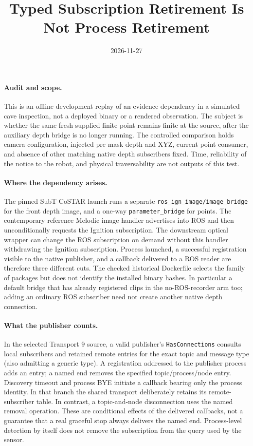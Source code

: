 \documentclass[11pt]{article}
\title{Typed Subscription Retirement Is Not Process Retirement}
\date{2026-11-27}
\begin{document}
\maketitle

\paragraph{Audit and scope.}
This is an offline development replay of an evidence dependency in
a simulated cave inspection, not a deployed binary or a rendered
observation. The subject is whether the same fresh supplied finite
point remains finite at the source, after the auxiliary depth bridge
is no longer running. The controlled comparison holds camera
configuration, injected pre-mask depth and XYZ, current point
consumer, and absence of other matching native depth subscribers fixed.
Time, reliability of the notice to the robot, and physical traversability
are not outputs of this test.

\paragraph{Where the dependency arises.}
The pinned SubT CoSTAR launch runs a separate
\texttt{ros\_ign\_image/image\_bridge} for the front depth image, and a
one-way \texttt{parameter\_bridge} for points. The contemporary reference
Melodic image handler advertises into ROS and then unconditionally
requests the Ignition subscription. The downstream optical wrapper
can change the ROS subscription on demand without this handler
withdrawing the Ignition subscription. Process launched, a successful
registration visible to the native publisher, and a callback delivered
to a ROS reader are therefore three different cuts. The checked historical
Dockerfile selects the family of packages but does not identify the
installed binary hashes. In particular a default bridge that has already
registered clips in the no-ROS-recorder arm too; adding an ordinary
ROS subscriber need not create another native depth connection.

\paragraph{What the publisher counts.}
In the selected Transport 9 source, a valid publisher's
\texttt{HasConnections} consults local subscribers and retained remote
entries for the exact topic and message type (also admitting a generic
type). A registration addressed to the publisher process adds an entry;
a named end removes the specified topic/process/node entry. Discovery
timeout and process BYE initiate a callback bearing only the process
identity. In that branch the shared transport deliberately retains its
remote-subscriber table. In contrast, a topic-and-node disconnection
uses the named removal operation. These are conditional effects of
the delivered callbacks, not a guarantee that a real graceful stop
always delivers the named end. Process-level detection by itself does
not remove the subscription from the query used by the sensor.
\end{document}
